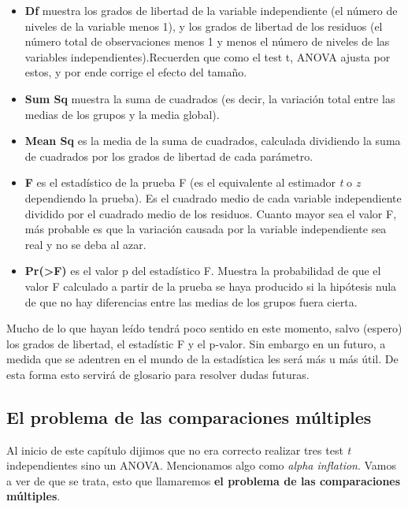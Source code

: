 \documentclass[
]{book}
\begin{document}
\begin{itemize}
\item
  \textbf{Df} muestra los grados de libertad de la variable independiente (el número de niveles de la variable menos 1), y los grados de libertad de los residuos (el número total de observaciones menos 1 y menos el número de niveles de las variables independientes).Recuerden que como el test t, ANOVA ajusta por estos, y por ende corrige el efecto del tamaño.
\item
  \textbf{Sum Sq} muestra la suma de cuadrados (es decir, la variación total entre las medias de los grupos y la media global).
\item
  \textbf{Mean Sq} es la media de la suma de cuadrados, calculada dividiendo la suma de cuadrados por los grados de libertad de cada parámetro.
\item
  \textbf{F} es el estadístico de la prueba F (es el equivalente al estimador \emph{t} o \emph{z} dependiendo la prueba). Es el cuadrado medio de cada variable independiente dividido por el cuadrado medio de los residuos. Cuanto mayor sea el valor F, más probable es que la variación causada por la variable independiente sea real y no se deba al azar.
\item
  \textbf{Pr(\textgreater F)} es el valor p del estadístico F. Muestra la probabilidad de que el valor F calculado a partir de la prueba se haya producido si la hipótesis nula de que no hay diferencias entre las medias de los grupos fuera cierta.
\end{itemize}

Mucho de lo que hayan leído tendrá poco sentido en este momento, salvo (espero) los grados de libertad, el estadístic F y el p-valor. Sin embargo en un futuro, a medida que se adentren en el mundo de la estadística les será más u más útil. De esta forma esto servirá de glosario para resolver dudas futuras.

\hypertarget{el-problema-de-las-comparaciones-muxfaltiples}{%
\subsection{El problema de las comparaciones múltiples}\label{el-problema-de-las-comparaciones-muxfaltiples}}

Al inicio de este capítulo dijimos que no era correcto realizar tres test \emph{t} independientes sino un ANOVA. Mencionamos algo como \emph{alpha inflation}. Vamos a ver de que se trata, esto que llamaremos \textbf{el problema de las comparaciones múltiples}.
\end{document}
